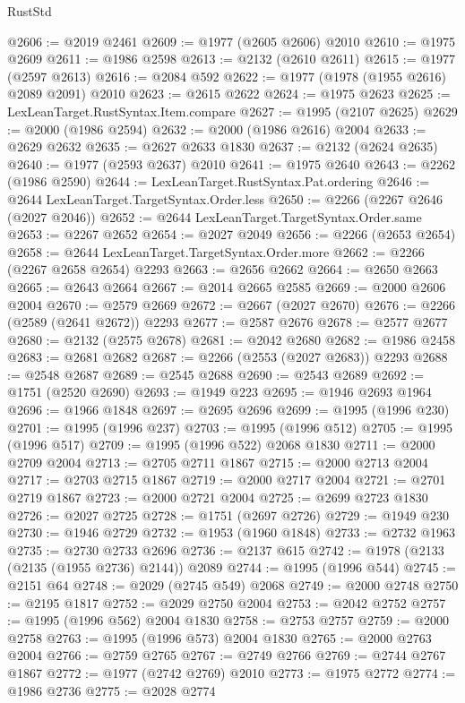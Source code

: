 \begin{lexlean}{RustStd}
\begin{coremodule}
@2606 := @2019 @2461
@2609 := @1977 (@2605 @2606) @2010
@2610 := @1975 @2609
@2611 := @1986 @2598
@2613 := @2132 (@2610 @2611)
@2615 := @1977 (@2597 @2613)
@2616 := @2084 @592
@2622 := @1977 (@1978 (@1955 @2616) @2089 @2091) @2010
@2623 := @2615 @2622
@2624 := @1975 @2623
@2625 := LexLeanTarget.RustSyntax.Item.compare
@2627 := @1995 (@2107 @2625)
@2629 := @2000 (@1986 @2594)
@2632 := @2000 (@1986 @2616) @2004
@2633 := @2629 @2632
@2635 := @2627 @2633 @1830
@2637 := @2132 (@2624 @2635)
@2640 := @1977 (@2593 @2637) @2010
@2641 := @1975 @2640
@2643 := @2262 (@1986 @2590)
@2644 := LexLeanTarget.RustSyntax.Pat.ordering
@2646 := @2644 LexLeanTarget.TargetSyntax.Order.less
@2650 := @2266 (@2267 @2646 (@2027 @2046))
@2652 := @2644 LexLeanTarget.TargetSyntax.Order.same
@2653 := @2267 @2652
@2654 := @2027 @2049
@2656 := @2266 (@2653 @2654)
@2658 := @2644 LexLeanTarget.TargetSyntax.Order.more
@2662 := @2266 (@2267 @2658 @2654) @2293
@2663 := @2656 @2662
@2664 := @2650 @2663
@2665 := @2643 @2664
@2667 := @2014 @2665 @2585
@2669 := @2000 @2606 @2004
@2670 := @2579 @2669
@2672 := @2667 (@2027 @2670)
@2676 := @2266 (@2589 (@2641 @2672)) @2293
@2677 := @2587 @2676
@2678 := @2577 @2677
@2680 := @2132 (@2575 @2678)
@2681 := @2042 @2680
@2682 := @1986 @2458
@2683 := @2681 @2682
@2687 := @2266 (@2553 (@2027 @2683)) @2293
@2688 := @2548 @2687
@2689 := @2545 @2688
@2690 := @2543 @2689
@2692 := @1751 (@2520 @2690)
@2693 := @1949 @223
@2695 := @1946 @2693 @1964
@2696 := @1966 @1848
@2697 := @2695 @2696
@2699 := @1995 (@1996 @230)
@2701 := @1995 (@1996 @237)
@2703 := @1995 (@1996 @512)
@2705 := @1995 (@1996 @517)
@2709 := @1995 (@1996 @522) @2068 @1830
@2711 := @2000 @2709 @2004
@2713 := @2705 @2711 @1867
@2715 := @2000 @2713 @2004
@2717 := @2703 @2715 @1867
@2719 := @2000 @2717 @2004
@2721 := @2701 @2719 @1867
@2723 := @2000 @2721 @2004
@2725 := @2699 @2723 @1830
@2726 := @2027 @2725
@2728 := @1751 (@2697 @2726)
@2729 := @1949 @230
@2730 := @1946 @2729
@2732 := @1953 (@1960 @1848)
@2733 := @2732 @1963
@2735 := @2730 @2733 @2696
@2736 := @2137 @615
@2742 := @1978 (@2133 (@2135 (@1955 @2736) @2144)) @2089
@2744 := @1995 (@1996 @544)
@2745 := @2151 @64
@2748 := @2029 (@2745 @549) @2068
@2749 := @2000 @2748
@2750 := @2195 @1817
@2752 := @2029 @2750 @2004
@2753 := @2042 @2752
@2757 := @1995 (@1996 @562) @2004 @1830
@2758 := @2753 @2757
@2759 := @2000 @2758
@2763 := @1995 (@1996 @573) @2004 @1830
@2765 := @2000 @2763 @2004
@2766 := @2759 @2765
@2767 := @2749 @2766
@2769 := @2744 @2767 @1867
@2772 := @1977 (@2742 @2769) @2010
@2773 := @1975 @2772
@2774 := @1986 @2736
@2775 := @2028 @2774

\end{coremodule}
\end{lexlean}
